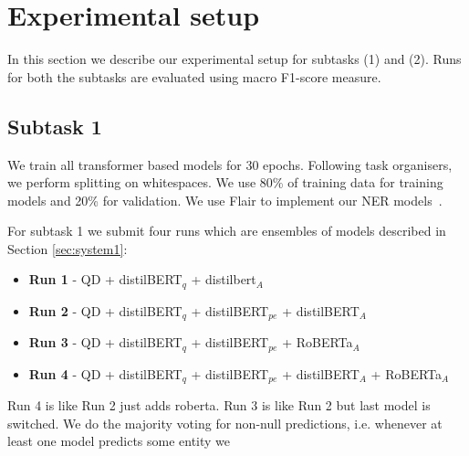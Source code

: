 \documentclass[11pt]{article}
\begin{document}
\section{Experimental setup}
In this section we describe our experimental setup for subtasks (1) and (2). 
%
%
%
Runs for both the subtasks are evaluated using macro F1-score measure.
%
%
%
\subsection{Subtask 1}

We train all transformer based models for 30 epochs. 
Following task organisers, we perform splitting on whitespaces.
We use 80\% of training data for training models and 20\% for validation.
We use Flair to implement our NER models~\cite{Akbik2019FLAIRAE}.

For subtask 1 we submit four runs which are ensembles of models described in Section \ref{sec:system1}:

\begin{itemize}
\item \textbf{Run 1} - QD + distilBERT$_q$ + distilbert$_A$
\item \textbf{Run 2} - QD + distilBERT$_q$ + distilBERT$_{pe}$ + distilBERT$_A$
\item \textbf{Run 3} - QD + distilBERT$_q$ + distilBERT$_{pe}$ + RoBERTa$_A$
\item \textbf{Run 4} - QD + distilBERT$_q$ + distilBERT$_{pe}$ + distilBERT$_A$ + RoBERTa$_A$ 
\end{itemize}

Run 4 is like Run 2 just adds roberta.
Run 3 is like Run 2 but last model is switched.
We do the majority voting for non-null predictions, i.e. whenever at least one model predicts some entity we 

%
%
%
\end{document}

